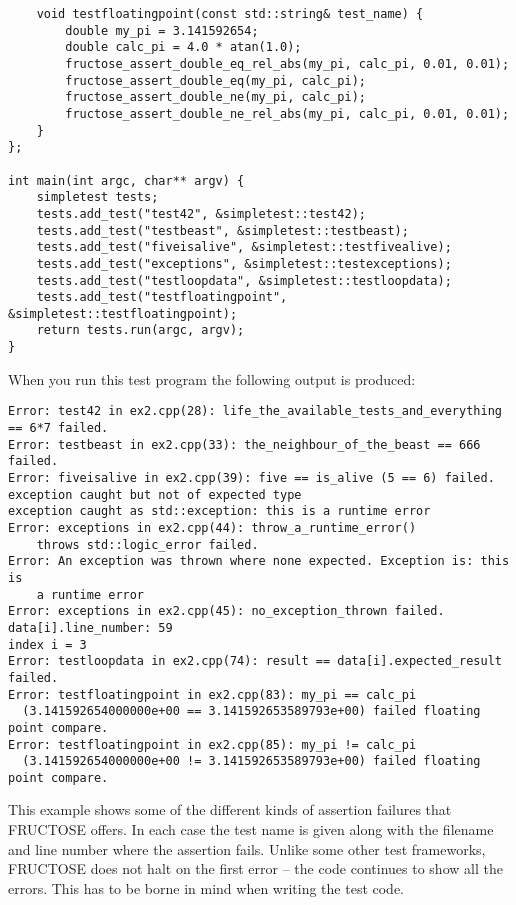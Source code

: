 \documentclass{book}
\begin{document}
\begin{verbatim}
    void testfloatingpoint(const std::string& test_name) {
        double my_pi = 3.141592654;
        double calc_pi = 4.0 * atan(1.0);
        fructose_assert_double_eq_rel_abs(my_pi, calc_pi, 0.01, 0.01);
        fructose_assert_double_eq(my_pi, calc_pi);
        fructose_assert_double_ne(my_pi, calc_pi);
        fructose_assert_double_ne_rel_abs(my_pi, calc_pi, 0.01, 0.01);
    }
};

int main(int argc, char** argv) {
    simpletest tests;
    tests.add_test("test42", &simpletest::test42);
    tests.add_test("testbeast", &simpletest::testbeast);
    tests.add_test("fiveisalive", &simpletest::testfivealive);
    tests.add_test("exceptions", &simpletest::testexceptions);
    tests.add_test("testloopdata", &simpletest::testloopdata);
    tests.add_test("testfloatingpoint", &simpletest::testfloatingpoint);
    return tests.run(argc, argv);
}
\end{verbatim}

When you run this test program the following output is produced:

\begin{verbatim}
Error: test42 in ex2.cpp(28): life_the_available_tests_and_everything == 6*7 failed.
Error: testbeast in ex2.cpp(33): the_neighbour_of_the_beast == 666 failed.
Error: fiveisalive in ex2.cpp(39): five == is_alive (5 == 6) failed.
exception caught but not of expected type
exception caught as std::exception: this is a runtime error
Error: exceptions in ex2.cpp(44): throw_a_runtime_error() 
    throws std::logic_error failed.
Error: An exception was thrown where none expected. Exception is: this is 
    a runtime error
Error: exceptions in ex2.cpp(45): no_exception_thrown failed.
data[i].line_number: 59
index i = 3
Error: testloopdata in ex2.cpp(74): result == data[i].expected_result failed.
Error: testfloatingpoint in ex2.cpp(83): my_pi == calc_pi 
  (3.141592654000000e+00 == 3.141592653589793e+00) failed floating point compare.
Error: testfloatingpoint in ex2.cpp(85): my_pi != calc_pi 
  (3.141592654000000e+00 != 3.141592653589793e+00) failed floating point compare.
\end{verbatim}

This example shows some of the different kinds of assertion failures
that FRUCTOSE offers.
In each case the test name is given along with the filename and line number where the
assertion fails. Unlike some other test frameworks, FRUCTOSE does not halt on the
first error -- the code continues to show all the errors.
This has to be borne in mind when writing the test code.
\end{document}
